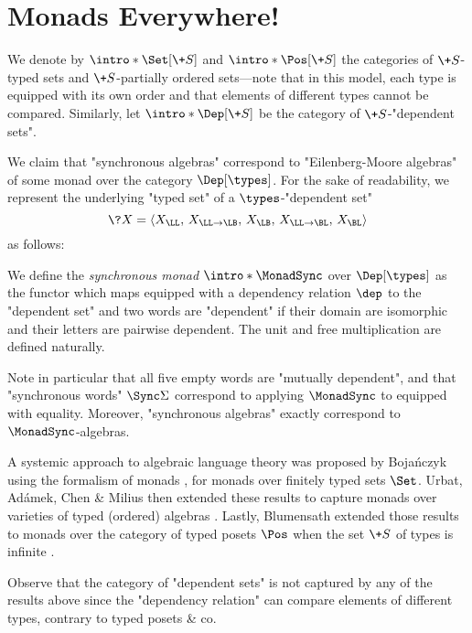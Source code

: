 \section{Monads Everywhere!}
\label{apdx:monads}

We denote by \AP$\intro*\Set[\+S]$ and $\intro*\Pos[\+S]$ the categories of $\+S$-typed sets
and $\+S$-partially ordered sets---note that in this model,
each type is equipped with its own order and
that elements of different types cannot be compared.
Similarly, let \AP$\intro*\Dep[\+S]$ be the category of $\+S$-"dependent sets".

We claim that "synchronous algebras" correspond to "Eilenberg-Moore algebras" of some monad over the category $\Dep[\types]$. For the sake of readability, we represent the underlying
"typed set" of a 
$\types$-"dependent set"
\[\?X = \langle X_{\LL},\, X_{\LL\to\LB},\, X_{\LB},\, X_{\LL\to\BL},\, X_{\BL} \rangle\]
as follows:

We define the \emph{synchronous monad}
\AP$\intro*\MonadSync$ over $\Dep[\types]$ as the functor which maps 
equipped with a dependency relation $\dep$ to the "dependent set"
and two words are "dependent" if their domain are isomorphic
and their letters are pairwise dependent.
The unit and free multiplication are defined naturally.

Note in particular that all five empty words are "mutually dependent",
and that "synchronous words" $\Sync\Sigma$ correspond to applying
$\MonadSync$ to
\PictureTypedSet{\Sigma\times\Sigma}{\emptyset}{\Sigma\times\{\pad\}}{\emptyset}{\{\pad\}\times\Sigma,}
equipped with equality.
Moreover, "synchronous algebras" exactly correspond to $\MonadSync$-algebras.


A systemic approach to algebraic language theory was proposed by Bojańczyk using the formalism of monads \cite{Bojanczyk2015Recognisable}, for monads over finitely typed sets $\Set$.
Urbat, Adámek, Chen \& Milius then extended these results to capture monads over varieties of typed (ordered) algebras \cite{UrbatAdamekChenMilius2017Eilenberg}.
Lastly, Blumensath extended those results to monads over the category of typed posets $\Pos$
when the set $\+S$ of types is infinite \cite{Blumensath2021Algebraic}. 

Observe that the category of "dependent sets" is not captured by any of the results above since
the "dependency relation" can compare elements of different types, contrary to typed posets \& co. 